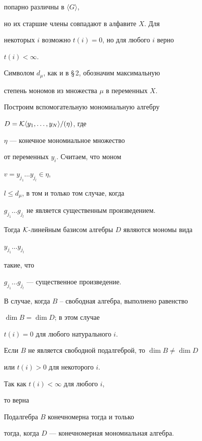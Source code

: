 попарно различны в $\langle G\rangle$,


но их старшие члены совпадают в алфавите $X$. Для


некоторых $i$ возможно $t(i)=0$, но для любого $i$ верно


$t(i)<\infty$.





Символом $d_{\mu}$, как и в \S\,2, обозначим максимальную


степень мономов из множества $\mu$ в переменных $X$.


Построим вспомогательную мономиальную алгебру


$D={\cal K}\langle y_{1},\dotsc,y_{N}\rangle /(\eta)$, где


$\eta$ --- конечное мономиальное множество


от переменных $y_{i}$. Считаем, что моном


$v=y_{j_{1}}\dotsc y_{j_{l}}\in\eta$,


$l\leq d_{\mu}$, в том и только том случае, когда


$g_{j_{1}}\dotsc g_{j_{l}}$ не является существенным произведением.


Тогда ${\cal K}$-линейным базисом алгебры $D$ являются мономы вида


$y_{j_{1}}\dotsc y_{j_{l}}$


такие, что


$g_{j_{1}}\dotsc g_{j_{l}}$ --- существенное произведение.





В случае, когда $B$ -- свободная алгебра, выполнено равенство


$\dim B=\dim D$; в этом случае


$t(i)=0$ для любого натурального $i$.


Если $B$ не является свободной подалгеброй, то $\dim B\ne \dim D$


или $t(i)>0$ для некоторого $i$.


Так как $t(i)<\infty$ для любого $i$,


то верна





\begin{thm}


Подалгебра $B$ конечномерна тогда и только


тогда, когда $D$ --- конечномерная мономиальная алгебра.


\end{thm}





